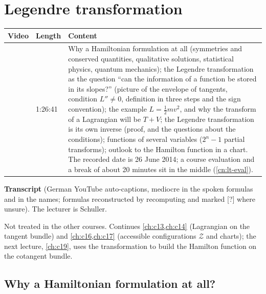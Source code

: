 \chapter{Legendre transformation}\label{ch:c18}
\begin{paracol}{2}

\begin{sources}
\begin{tabularx}{\linewidth}{@{}l l L@{}}
\toprule
\textbf{Video} & \textbf{Length} & \textbf{Content}\\
\midrule
{} & 1:26:41 & Why a Hamiltonian formulation at all (symmetries and conserved quantities, qualitative solutions, statistical physics, quantum mechanics); the Legendre transformation as the question ``can the information of a function be stored in its slopes?'' (picture of the envelope of tangents, condition $L''\neq0$, definition in three steps and the sign convention); the example $L=\tfrac12mv^2$, and why the transform of a Lagrangian will be $T+V$; the Legendre transformation is its own inverse (proof, and the questions about the conditions); functions of several variables ($2^n-1$ partial transforms); outlook to the Hamilton function in a chart. The recorded date is 26 June 2014; a course evaluation and a break of about 20 minutes sit in the middle (\cref{cn:lt-eval}).\\
\bottomrule
\end{tabularx}

\smallskip
\textbf{Transcript}  (German YouTube auto-captions, mediocre in the spoken formulas and in the names; formulas reconstructed by recomputing and marked [?] where unsure). The lecturer is Schuller.
\end{sources}

\begin{reading}
Not treated in the other courses.
Continues \cref{ch:c13,ch:c14} (Lagrangian on the tangent bundle) and \cref{ch:c16,ch:c17} (accessible configurations $\mathcal Z$ and charts); the next lecture, \cref{ch:c19}, uses the transformation to build the Hamilton function on the cotangent bundle.
\end{reading}

\section{Why a Hamiltonian formulation at all?}\label{sec:lt-why}


\end{paracol}
